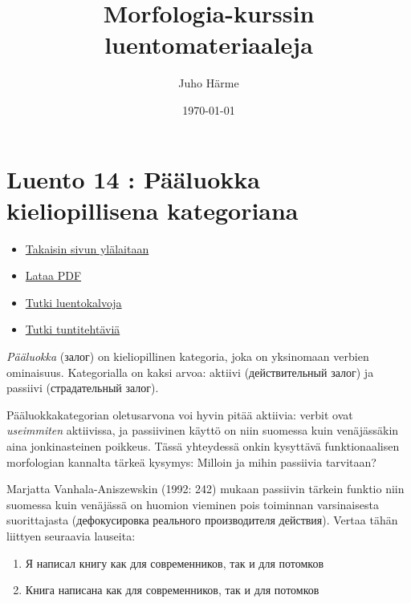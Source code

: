 \documentclass[]{scrartcl}
\author{Juho Härme}
\title{Morfologia-kurssin luentomateriaaleja}
\date{\today}
\providecommand{\tightlist}{%
  \setlength{\itemsep}{0pt}\setlength{\parskip}{0pt}}
\begin{document}
\maketitle
\tableofcontents
\newpage



\section{Luento 14 : Pääluokka kieliopillisena
kategoriana}\label{luento-14-puxe4uxe4luokka-kieliopillisena-kategoriana}

\begin{itemize}
\tightlist
\item
  \href{https://mustikka.uta.fi/~juho_harme/morfologia/\#tästä-kurssista}{Takaisin
  sivun ylälaitaan}
\item
  \href{http://mustikka.uta.fi/~juho_harme/morfologia/materiaalit/luento14.pdf}{Lataa
  PDF}
\item
  \href{http://mustikka.uta.fi/~juho_harme/morfologia/presentations/luento14.html}{Tutki
  luentokalvoja}
\item
  \href{http://mustikka.uta.fi/~juho_harme/morfologia/tehtavat/luento14.pdf}{Tutki
  tuntitehtäviä}
\end{itemize}

\emph{Pääluokka} (залог) on kieliopillinen kategoria, joka on yksinomaan
verbien ominaisuus. Kategorialla on kaksi arvoa: aktiivi (действительный
залог) ja passiivi (страдательный залог).

Pääluokkakategorian oletusarvona voi hyvin pitää aktiivia: verbit ovat
\emph{useimmiten} aktiivissa, ja passiivinen käyttö on niin suomessa
kuin venäjässäkin aina jonkinasteinen poikkeus. Tässä yhteydessä onkin
kysyttävä funktionaalisen morfologian kannalta tärkeä kysymys: Milloin
ja mihin passiivia tarvitaan?

Marjatta Vanhala-Aniszewskin (1992: 242) mukaan passiivin tärkein
funktio niin suomessa kuin venäjässä on huomion vieminen pois toiminnan
varsinaisesta suorittajasta (дефокусировка реального производителя
действия). Vertaa tähän liittyen seuraavia lauseita:

\begin{enumerate}
\def\labelenumi{(\arabic{enumi})}
\tightlist
\item
  Я написал книгу как для современников, так и для потомков
\item
  Книга написана как для современников, так и для потомков
\end{enumerate}
\end{document}
